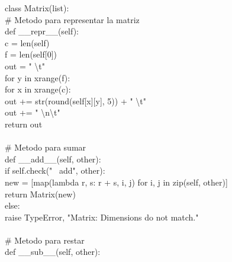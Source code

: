 \documentclass[10pt,letterpaper]{article}
\newenvironment{Code}
{
\begin{lrbox}{\selvestebox}%
\begin{minipage}{\dimexpr\columnwidth-2\fboxsep\relax}
\fontfamily{\ttdefault}\selectfont
}
{\end{minipage}\end{lrbox}%
\begin{center}
\colorbox{light-gray}{\usebox{\selvestebox}}
\end{center}
}
\begin{document}
\begin{scriptsize}
\begin{Code}
class Matrix(list):\\
\hspace*{5mm} \# Metodo para representar la matriz\\
\hspace*{5mm} def \_\_repr\_\_(self):\\
\hspace*{11mm} c = len(self)\\
\hspace*{11mm} f = len(self[0])\\
\hspace*{11mm} out = " \textbackslash t"\\
\hspace*{11mm} for y in xrange(f):\\
\hspace*{17mm} for x in xrange(c):\\
\hspace*{23mm} out += str(round(self[x][y], 5)) + " \textbackslash t"\\
\hspace*{17mm} out += " \textbackslash n\textbackslash t"\\
\hspace*{11mm} return out\\
\\
\hspace*{5mm} \# Metodo para sumar\\
\hspace*{5mm} def \_\_add\_\_(self, other):\\
\hspace*{11mm} if self.check("\ \hspace*{-3mm} add", other):\\
\hspace*{17mm} new = [map(lambda r, s: r + s, i, j) for i, j in zip(self, other)]\\
\hspace*{17mm} return Matrix(new)\\
\hspace*{11mm} else:\\
\hspace*{17mm} raise TypeError, "Matrix: Dimensions do not match."\\
\\
\hspace*{5mm} \# Metodo para restar\\
\hspace*{5mm} def \_\_sub\_\_(self, other):\\

\end{Code}
\end{scriptsize}
\end{document}

